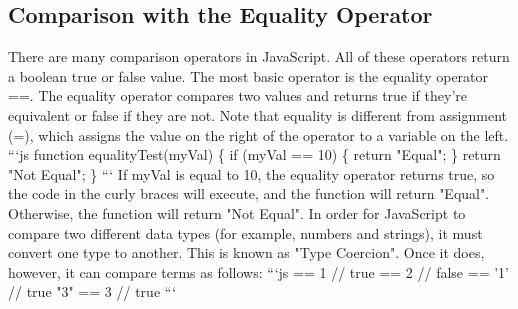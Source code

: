 \documentclass{article}%
\begin{document}
\subsection{Comparison with the Equality Operator}%
\label{subsec:ComparisonwiththeEqualityOperator}%
There are many comparison operators in JavaScript. All of these operators return a boolean true or false value.\newline%
The most basic operator is the equality operator ==. The equality operator compares two values and returns true if they're equivalent or false if they are not. Note that equality is different from assignment (=), which assigns the value on the right of the operator to a variable on the left.\newline%
```js\newline%
function equalityTest(myVal) \{\newline%
  if (myVal == 10) \{\newline%
     return "Equal";\newline%
  \}\newline%
  return "Not Equal";\newline%
\}\newline%
```\newline%
If myVal is equal to 10, the equality operator returns true, so the code in the curly braces will execute, and the function will return "Equal". Otherwise, the function will return "Not Equal".\newline%
In order for JavaScript to compare two different data types (for example, numbers and strings), it must convert one type to another. This is known as "Type Coercion". Once it does, however, it can compare terms as follows:\newline%
```js   ==  1   // true   ==  2   // false   == '1'  // true\newline%
"3" ==  3   // true\newline%
```\newline%

%
\end{document}
